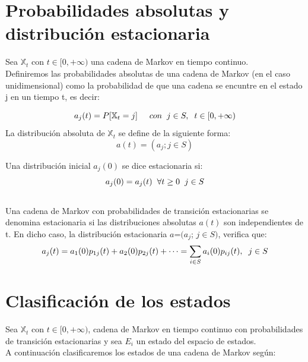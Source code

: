 \documentclass[12pt,a4paper]{article}
\begin{document}
\section{Probabilidades absolutas y distribución estacionaria}
	Sea $\mathbb{X}_{t}$ con $t\in[0,+\infty)$ una cadena de Markov en tiempo continuo.
	\\
	Definiremos las probabilidades absolutas de una cadena de Markov (en el caso unidimensional) como la probabilidad de que una cadena se encuntre en el estado j en un tiempo t, es decir:

\begin{equation*}	
	 a_{j}(t)=P[\mathbb{X}_{t}=j] \hspace{0.5cm}  con \hspace{0.2cm} j\in{S}, \hspace{0.2cm}  t\in[0,+\infty)
 \end{equation*}
	La distribución absoluta de $\mathbb{X}_{t}$ se define de la siguiente forma:
			\begin{equation*}
			a(t)=(a_{j}; j\in{S})
		\end{equation*}
		
		Una distribución inicial $a_{j}(0)$ se dice estacionaria si: 
				\begin{equation*}
			a_{j}(0)=a_{j}(t) \hspace{0.2cm}  \forall t\geq 0 \hspace{0.2cm} j\in S
		\end{equation*}
	\\
			Una cadena de Markov con probabilidades de transición estacionarias se denomina estacionaria si las distribuciones absolutas
		$a(t)$ son independientes de t. En dicho caso, la distribución estacionaria $a$=$(a_{j}$; $j\in{S})$, verifica que:
		\begin{equation*}
		a_{j}(t)=a_{1}(0)p_{1j}(t)+a_{2}(0)p_{2j}(t)+\cdots=\sum_{i\in{S}} a_{i}(0)p_{ij}(t), \hspace{0.2cm} j\in S
	\end{equation*}
\section{Clasificación de los estados}
	Sea $\mathbb{X}_{t}$ con $t\in[0,+\infty)$,  cadena de Markov en tiempo continuo con probabilidades de transición estacionarias y sea $E_{i}$ un estado del espacio de estados.
	\\
		A continuación clasificaremos los estados de una cadena de Markov según:
	
\end{document}
